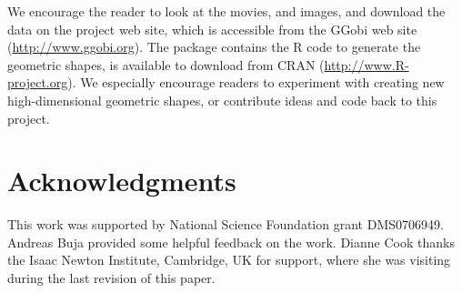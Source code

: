 We encourage the reader to look at the movies, and images, and
download the data on the project web site, which is accessible from
the GGobi web site (\url{http://www.ggobi.org}). The 
package contains the R code to generate the geometric shapes, is
available to download from CRAN (\url{http://www.R-project.org}). We
especially encourage readers to experiment with creating new
high-dimensional geometric shapes, or contribute ideas and code back to this project.

\section*{Acknowledgments}

This work was supported by National Science Foundation grant
DMS0706949. Andreas Buja provided some helpful feedback on the
work. Dianne Cook thanks the Isaac Newton Institute, Cambridge, UK for
support, where she was visiting during the last revision of this paper.



\address{Barret Schloerke\\
  Department of Statistics \\
  Purdue University \\
  250 N. University Street\\
  West Lafayette, IN 47907\\
  USA} \\

\address{Hadley Wickham\\
  RStudio Inc} \\

\address{Dianne Cook\\
  Department of Econometrics and Business Statistics\\
  Monash University\\
  Wellington Road \\
  Clayton, Victoria 3800\\
  Australia}\\

\address{Heike Hofmann\\
  Department of Statistics\\
  Iowa State University \\
  Snedecor Hall \\
  Ames, Iowa 50011\\
  USA}\\
